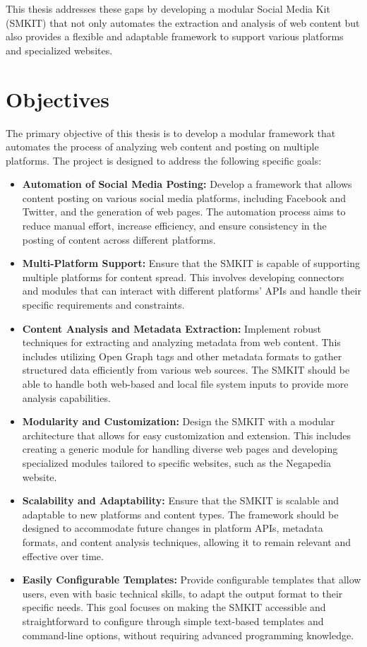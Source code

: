 This thesis addresses these gaps by developing a modular Social Media Kit (SMKIT) that not only automates the extraction and analysis of web content but also provides a flexible and adaptable framework to support various platforms and specialized websites.


\section{Objectives}
\label{sec:objectives}
The primary objective of this thesis is to develop a modular framework that automates the process of analyzing web content and posting on multiple platforms. The project is designed to address the following specific goals:

\begin{itemize}
    \item \textbf{Automation of Social Media Posting:} Develop a framework that allows content posting on various social media platforms, including Facebook and Twitter, and the generation of web pages. The automation process aims to reduce manual effort, increase efficiency, and ensure consistency in the posting of content across different platforms.

    \item \textbf{Multi-Platform Support:} Ensure that the SMKIT is capable of supporting multiple platforms for content spread. This involves developing connectors and modules that can interact with different platforms' APIs and handle their specific requirements and constraints.

    \item \textbf{Content Analysis and Metadata Extraction:} Implement robust techniques for extracting and analyzing metadata from web content. This includes utilizing Open Graph tags and other metadata formats to gather structured data efficiently from various web sources. The SMKIT should be able to handle both web-based and local file system inputs to provide more analysis capabilities.

    \item \textbf{Modularity and Customization:} Design the SMKIT with a modular architecture that allows for easy customization and extension. This includes creating a generic module for handling diverse web pages and developing specialized modules tailored to specific websites, such as the Negapedia website.

    \item \textbf{Scalability and Adaptability:} Ensure that the SMKIT is scalable and adaptable to new platforms and content types. The framework should be designed to accommodate future changes in platform APIs, metadata formats, and content analysis techniques, allowing it to remain relevant and effective over time.

    \item \textbf{Easily Configurable Templates:} Provide configurable templates that allow users, even with basic technical skills, to adapt the output format to their specific needs. This goal focuses on making the SMKIT accessible and straightforward to configure through simple text-based templates and command-line options, without requiring advanced programming knowledge.
\end{itemize}
